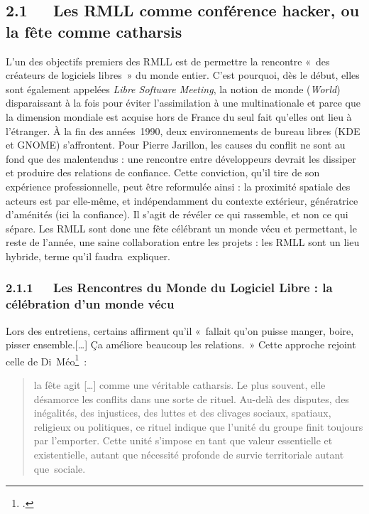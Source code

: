 \documentclass{FramateX}
\begin{document}
\begin{refsection}
\subsection*{2.1~~~Les RMLL comme conférence hacker, ou la fête comme catharsis}
{}

L'un des objectifs premiers des RMLL est de permettre la rencontre
«~des créateurs de logiciels libres~» du monde
entier. C'est pourquoi, dès le début, elles sont également appelées
\textit{Libre Software Meeting}, la notion de monde (\textit{World})
disparaissant à la fois pour éviter l'assimilation à une multinationale
et parce que la dimension mondiale est acquise hors de France du seul
fait qu'elles ont lieu à l'étranger. À la fin des années~1990, deux
environnements de bureau libres (KDE et GNOME) s'affrontent. Pour
Pierre Jarillon, les causes du conflit ne sont au fond que des
malentendus : une rencontre entre développeurs devrait les dissiper et
produire des relations de confiance. Cette conviction, qu'il tire de
son expérience professionnelle, peut être reformulée ainsi : la
proximité spatiale des acteurs est par elle-même, et indépendamment du
contexte extérieur, génératrice d'aménités (ici la confiance). Il
s'agit de révéler ce qui rassemble, et non ce qui sépare. Les RMLL sont
donc une fête célébrant un monde vécu et permettant, le reste de
l'année, une saine collaboration entre les projets : les RMLL sont un
lieu hybride, terme qu'il faudra~expliquer.

\subsubsection*{2.1.1~~~Les Rencontres du Monde du Logiciel Libre : la célébration d'un monde vécu}
{}

Lors des entretiens, certains affirment qu'il
«~fallait qu'on puisse manger, boire, pisser
ensemble.[…] Ça
améliore beaucoup les relations.~» Cette approche rejoint celle de
Di~Méo\footnote{\cite[p.~17]{dimeogeographie2001}.}~:

\begin{quote}
la fête agit […] comme une véritable catharsis. Le plus souvent, elle
désamorce les conflits dans une sorte de rituel. Au-delà des disputes,
des inégalités, des injustices, des luttes et des clivages sociaux,
spatiaux, religieux ou politiques, ce rituel indique que l'unité du
groupe finit toujours par l'emporter. Cette unité s'impose en tant que
valeur essentielle et existentielle, autant que nécessité profonde de
survie territoriale autant que~sociale.
\end{quote}


\end{refsection}
\end{document}
